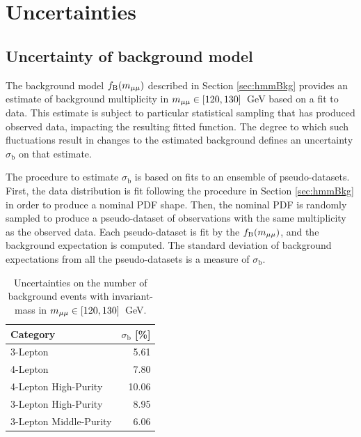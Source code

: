 \section{Uncertainties}\label{sec:hmmSyst}

\subsection{Uncertainty of background model}\label{sec:hmmBkgUncert}

The background model $f_\text{B}(m_{\mu\mu})$ described in Section \ref{sec:hmmBkg} provides an estimate of background multiplicity in $m_{\mu\mu}\in[120,130]$~GeV based on a fit to data.
This estimate is subject to particular statistical sampling that has produced observed data, impacting the resulting fitted function.
The degree to which such fluctuations result in changes to the estimated background defines an uncertainty $\sigma_\text{b}$ on that estimate.

The procedure to estimate $\sigma_\text{b}$ is based on fits to an ensemble of pseudo-datasets.
First, the data distribution is fit following the procedure in Section \ref{sec:hmmBkg} in order to produce a nominal PDF shape.
Then, the nominal PDF is randomly sampled to produce a pseudo-dataset of observations with the same multiplicity as the observed data.
Each pseudo-dataset is fit by the $f_\text{B}(m_{\mu\mu})$, and the background expectation is computed.
The standard deviation of background expectations from all the pseudo-datasets is a measure of $\sigma_\text{b}$.

\begin{table}[htp]
\caption{Uncertainties on the number of background events with invariant-mass in $m_{\mu\mu}\in[120,130]$~GeV.}
\begin{center}
\begin{tabular}{l r}
\toprule
Category & $\sigma_\text{b}$ [\%] \\
\midrule
    3-Lepton               & 5.61 \\
    4-Lepton               & 7.80 \\
\midrule
    4-Lepton High-Purity   & 10.06 \\
    3-Lepton High-Purity   & 8.95 \\
    3-Lepton Middle-Purity & 6.06 \\
\bottomrule
\end{tabular}
\label{tab:hmmSigmsB}
\end{center}
\end{table}

